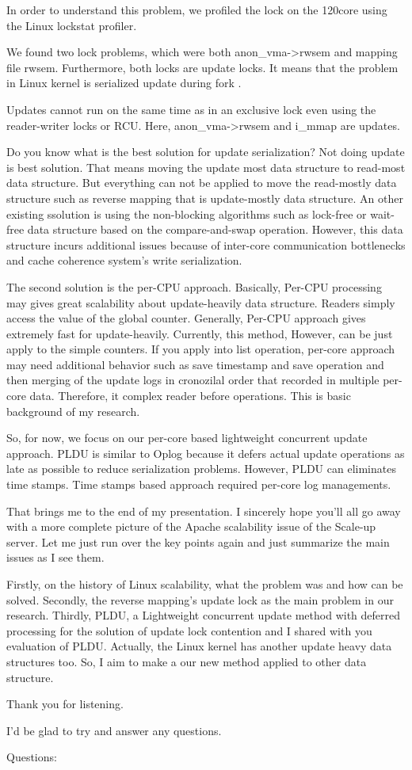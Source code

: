 In order to understand this problem, we profiled the lock on the 120core using
the Linux lockstat profiler.

We found two lock problems, which were both anon_vma->rwsem and  mapping file rwsem.
Furthermore, both locks are update locks.
It means that the problem in Linux kernel is serialized update during fork .

Updates cannot run on the same time as in an exclusive lock even
using the reader-writer locks or RCU.
Here, anon_vma->rwsem and i_mmap are updates.

Do you know what is the best solution for update serialization?
Not doing update is best solution.
That means moving the update most data structure to read-most data structure.
But everything can not be applied to move the read-mostly data structure such
as reverse mapping that is update-mostly data structure.
An other existing ssolution is using the non-blocking algorithms such as
lock-free or wait-free data structure based on the compare-and-swap operation.
However, this data structure incurs additional issues because of inter-core
communication bottlenecks and cache coherence system's write serialization.

The second solution is the per-CPU approach.
Basically, Per-CPU processing may gives great scalability about update-heavily
data structure.
Readers simply access the value of the global counter.
Generally, Per-CPU approach gives extremely fast for update-heavily.
Currently, this method, However, can be just apply to the simple counters.
If you apply into list operation, per-core approach may need additional
behavior such as save timestamp and save operation and then merging of the
update logs in cronozilal order that recorded in multiple per-core data.
Therefore, it complex reader before operations.
This is basic background of my research.

So, for now, we focus on our per-core based lightweight concurrent update
approach.
PLDU is similar to Oplog because it defers actual update operations as late
as possible to reduce serialization problems.
However, PLDU can eliminates time stamps.
Time stamps based approach required per-core log managements.

That brings me to the end of my presentation.
I sincerely hope you'll all go away with a more complete picture of the
Apache scalability issue of the Scale-up server.
Let me just run over the key points again and just summarize the main issues as
I see them.

Firstly, on the history of Linux scalability, what the problem was and how can
be solved.
Secondly, the reverse mapping's update lock as the main problem in our research.
Thirdly, PLDU, a Lightweight concurrent update method with deferred processing
for the solution of update lock contention and I shared with you evaluation of
PLDU.
Actually, the Linux kernel has another update heavy data structures too.
So, I aim to make a our new method applied to other data structure.

Thank you for listening.

I'd be glad to try and answer any questions.

Questions:
